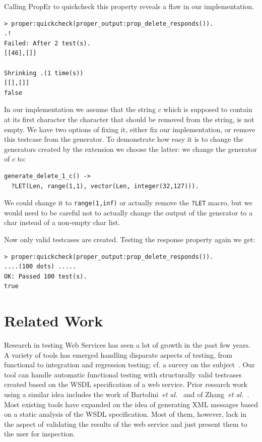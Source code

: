 \documentclass[submission,copyright]{eptcs}
\newcommand{\LET}{\texttt{?LET}\xspace}
\begin{document}
Calling PropEr to quickcheck this property reveals a flaw in our implementation.
\begin{lstlisting}
> proper:quickcheck(proper_output:prop_delete_responds()). 
.!
Failed: After 2 test(s).
[[46],[]]

Shrinking .(1 time(s))
[[],[]]
false
\end{lstlisting}

In our implementation we assume that the string $c$ which is supposed
to contain at its first character the character that should be removed
from the string, is not empty. We have two options of fixing it, either
fix our implementation, or remove this testcase from the generator. To
demonstrate how easy it is to change the generators created by the extension
we choose the latter: we change the generator of $c$ to:
\begin{lstlisting}
generate_delete_1_c() ->
  ?LET(Len, range(1,1), vector(Len, integer(32,127))).
\end{lstlisting}

We could change it to \texttt{range(1,inf)} or actually remove the
\LET macro, but we would need to be careful not to actually change the
output of the generator to a char instead of a non-empty char list.

Now only valid testcases are created. Testing the response property again we 
get:
\begin{lstlisting}
> proper:quickcheck(proper_output:prop_delete_responds()).
....(100 dots) .....
OK: Passed 100 test(s).
true
\end{lstlisting}

\section{Related Work} \label{sec:related}

Research in testing Web Services has seen a lot of growth in the past
few years. A variety of tools has emerged handling disparate aspects
of testing, from functional to integration and regression testing; cf.
a survey on the subject~\cite{SOATesting@springerlink-09}. Our tool
can handle automatic functional testing with structurally valid
testcases created based on the WSDL specification of a web service.
Prior research work using a similar idea includes the work of
Bartolini~\textit{et al.}~\cite{bartolini@ICSOC-08} and of
Zhang~\textit{et al.}~\cite{zhang@IC-08}. Most existing tools have
expanded on the idea of generating XML messages based on a static
analysis of the WSDL specification. Most of them, however, lack in the
aspect of validating the results of the web service and just present
them to the user for inspection.
\end{document}
